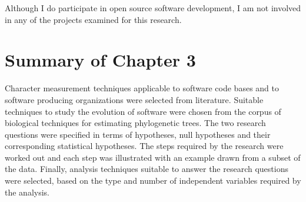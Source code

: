 Although I do participate in open source software development, I am not involved in any of the projects examined for this research.
\section{Summary of Chapter 3}
Character measurement techniques applicable to software code bases and to software producing organizations were selected from literature. Suitable techniques to study the evolution of software were chosen from the corpus of biological techniques for estimating phylogenetic trees. The two research questions were specified in terms of hypotheses, null hypotheses and their corresponding statistical hypotheses. The steps required by the research were worked out and each step was illustrated with an example drawn from a subset of the data. Finally, analysis techniques suitable to answer the research questions were selected, based on the type and number of independent variables required by the analysis.


